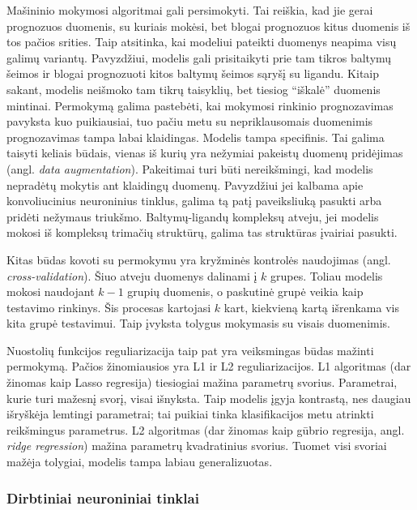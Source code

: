 Mašininio mokymosi algoritmai gali persimokyti.\cite{ragoza_proteinligand_2017} Tai reiškia, kad jie gerai prognozuos duomenis, su kuriais mokėsi, bet blogai prognozuos kitus duomenis iš tos pačios srities. Taip atsitinka, kai modeliui pateikti duomenys neapima visų galimų variantų. Pavyzdžiui, modelis gali prisitaikyti prie tam tikros baltymų šeimos ir blogai prognozuoti kitos baltymų šeimos sąryšį su ligandu. Kitaip sakant, modelis neišmoko tam tikrų taisyklių, bet tiesiog \enquote{iškalė} duomenis mintinai. Permokymą galima pastebėti, kai mokymosi rinkinio prognozavimas pavyksta kuo puikiausiai, tuo pačiu metu su nepriklausomais duomenimis prognozavimas tampa labai klaidingas. Modelis tampa specifinis.\cite{lehr_playing_2017} Tai galima taisyti keliais būdais, vienas iš kurių yra nežymiai pakeistų duomenų pridėjimas (angl. \textit{data augmentation}).\cite{ragoza_proteinligand_2017} Pakeitimai turi būti nereikšmingi, kad modelis nepradėtų mokytis ant klaidingų duomenų. Pavyzdžiui jei kalbama apie konvoliucinius neuroninius tinklus, galima tą patį paveiksliuką pasukti arba pridėti nežymaus triukšmo. Baltymų-ligandų kompleksų atveju, jei modelis mokosi iš kompleksų trimačių struktūrų, galima tas struktūras įvairiai pasukti. 

Kitas būdas kovoti su permokymu yra kryžminės kontrolės naudojimas (angl. \textit{cross-validation}).\cite{lehr_playing_2017}\cite{wojcikowski_performance_2017} Šiuo atveju duomenys dalinami į $k$ grupes. Toliau modelis mokosi naudojant $k-1$ grupių duomenis, o paskutinė grupė veikia kaip testavimo rinkinys. Šis procesas kartojasi $k$ kart, kiekvieną kartą išrenkama vis kita grupė testavimui. Taip įvyksta tolygus mokymasis su visais duomenimis.\cite{wojcikowski_performance_2017}

Nuostolių funkcijos reguliarizacija taip pat yra veiksmingas būdas mažinti permokymą. Pačios žinomiausios yra L1 ir L2 reguliarizacijos. L1 algoritmas (dar žinomas kaip Lasso regresija) tiesiogiai mažina parametrų svorius. Parametrai, kurie turi mažesnį svorį, visai išnyksta. Taip modelis įgyja kontrastą, nes daugiau išryškėja lemtingi parametrai; tai puikiai tinka klasifikacijos metu atrinkti reikšmingus parametrus. L2 algoritmas (dar žinomas kaip gūbrio regresija, angl. \textit{ridge regression}) mažina parametrų kvadratinius svorius. Tuomet visi svoriai mažėja tolygiai, modelis tampa labiau generalizuotas.\cite{stepniewska-dziubinska_development_2018}

\subsubsection{Dirbtiniai neuroniniai tinklai}
\label{sec:neuroniniai_tinklai}

